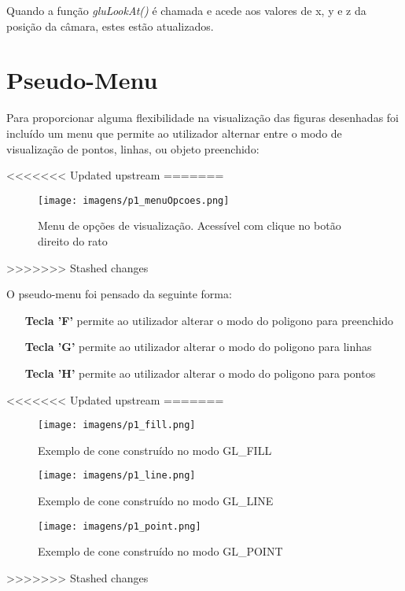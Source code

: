 Quando a função \textit{gluLookAt()} é chamada e acede aos valores de x, y e z da posição da câmara, estes estão atualizados.

\section{Pseudo-Menu}

Para proporcionar alguma flexibilidade na visualização das figuras desenhadas foi incluído um menu que permite ao utilizador alternar entre o modo de visualização de pontos, linhas, ou objeto preenchido:

<<<<<<< Updated upstream
=======
\begin{figure}[htpb]
	\centering
	\texttt{[image: imagens/p1\_menuOpcoes.png]}
	\caption{Menu de opções de visualização. Acessível com clique no botão direito do rato}
	\label{p1:fig:p1_menuOpcoes}
\end{figure}
>>>>>>> Stashed changes

O pseudo-menu foi pensado da seguinte forma:

\begin{itemize}
	\item[\textbf{Tecla 'F'}] permite ao utilizador alterar o modo do poligono para preenchido
	\item[\textbf{Tecla 'G'}] permite ao utilizador alterar o modo do poligono para linhas
	\item[\textbf{Tecla 'H'}] permite ao utilizador alterar o modo do poligono para pontos
\end{itemize}






<<<<<<< Updated upstream
=======
\begin{figure}[htpb]
	\centering
	\texttt{[image: imagens/p1\_fill.png]}
	\caption{Exemplo de cone construído no modo GL\_FILL}
	\label{p1:fig:p1_fill}
\end{figure}

\begin{figure}[htpb]
	\centering
	\texttt{[image: imagens/p1\_line.png]}
	\caption{Exemplo de cone construído no modo GL\_LINE}
	\label{p1:fig:p1_line}
\end{figure}

\begin{figure}[htpb]
	\centering
	\texttt{[image: imagens/p1\_point.png]}
	\caption{Exemplo de cone construído no modo GL\_POINT}
	\label{p1:fig:p1_point}
\end{figure}
>>>>>>> Stashed changes



